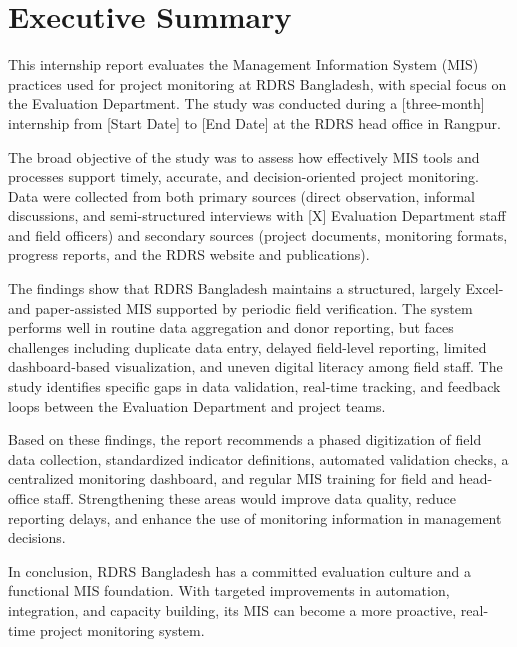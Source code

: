 \documentclass[12pt,a4paper]{report}
\begin{document}
\chapter*{Executive Summary}

This internship report evaluates the Management Information System (MIS)
practices used for project monitoring at RDRS Bangladesh, with special
focus on the Evaluation Department. The study was conducted during a
[three-month] internship from [Start Date] to [End Date] at the RDRS
head office in Rangpur.

The broad objective of the study was to assess how effectively MIS tools
and processes support timely, accurate, and decision-oriented project
monitoring. Data were collected from both primary sources (direct
observation, informal discussions, and semi-structured interviews with
[X] Evaluation Department staff and field officers) and secondary
sources (project documents, monitoring formats, progress reports, and
the RDRS website and publications).

The findings show that RDRS Bangladesh maintains a structured,
largely Excel- and paper-assisted MIS supported by periodic field
verification. The system performs well in routine data aggregation and
donor reporting, but faces challenges including duplicate data entry,
delayed field-level reporting, limited dashboard-based visualization,
and uneven digital literacy among field staff. The study identifies
specific gaps in data validation, real-time tracking, and feedback
loops between the Evaluation Department and project teams.

Based on these findings, the report recommends a phased digitization of
field data collection, standardized indicator definitions, automated
validation checks, a centralized monitoring dashboard, and regular MIS
training for field and head-office staff. Strengthening these areas
would improve data quality, reduce reporting delays, and enhance the
use of monitoring information in management decisions.

In conclusion, RDRS Bangladesh has a committed evaluation culture and a
functional MIS foundation. With targeted improvements in automation,
integration, and capacity building, its MIS can become a more
proactive, real-time project monitoring system.
\newpage

\tableofcontents
\newpage
\listoftables
\listoffigures
\newpage
\end{document}
